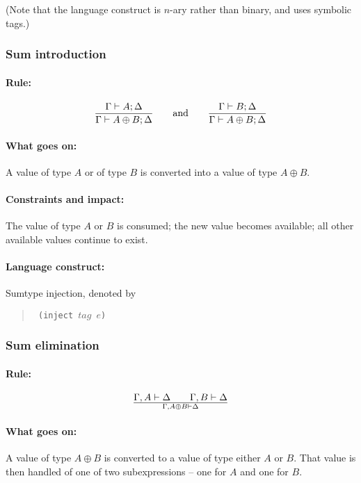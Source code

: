 \documentclass[a4paper]{article}
\begin{document}
(Note that the language construct is $n$-ary rather than binary, and
uses symbolic tags.)


\subsubsection{Sum introduction}
\paragraph{Rule:}
$$
{{
  \Gamma \vdash A;\Delta
}\over{
  \Gamma \vdash A \oplus B;\Delta
}}
\qquad \textrm{and} \qquad
{{
  \Gamma \vdash B;\Delta
}\over{
  \Gamma \vdash A \oplus B;\Delta
}}
$$

\paragraph{What goes on:} A value of type $A$ or of type $B$ is
converted into a value of type $A \oplus B$.

\paragraph{Constraints and impact:} The value of type $A$ or $B$ is
consumed; the new value becomes available; all other available values
continue to exist.

\paragraph{Language construct:} Sumtype injection, denoted by
\begin{quote}\tt
  (inject $\mathit{tag}$ $e$)
\end{quote}


\subsubsection{Sum elimination}
\paragraph{Rule:}
$$
{
  \Gamma,A \vdash \Delta \qquad \Gamma,B \vdash \Delta
}\over{
  \Gamma, A\oplus B \vdash \Delta
}
$$

\paragraph{What goes on:} A value of type $A \oplus B$ is converted to
a value of type either $A$ or $B$. That value is then handled of one
of two subexpressions -- one for $A$ and one for $B$.
\end{document}

